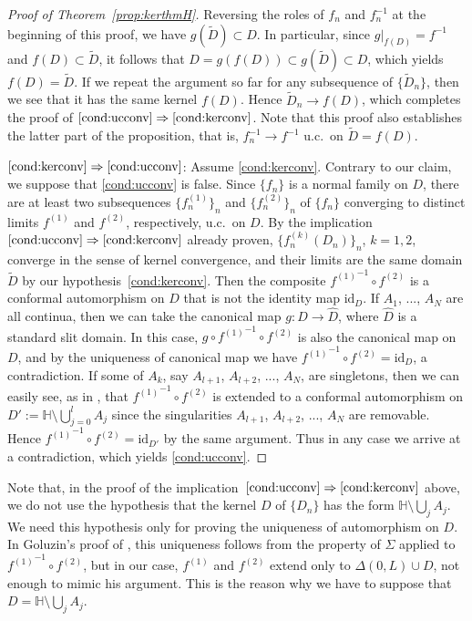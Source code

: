 \documentclass[preprint,12pt]{elsarticle}
\theoremstyle{definition}
\newcommand{\uhp}{\mathbb{H}}
\begin{document}
\begin{proof}[Proof of Theorem~\ref{prop:kerthmH}]
Reversing the roles of $f_n$ and $f_n^{-1}$ at the beginning of this proof,
we have $g(\tilde{D}) \subset D$.
In particular, since $g|_{f(D)}=f^{-1}$ and $f(D) \subset \tilde{D}$, it follows that
$D=g(f(D)) \subset g(\tilde{D}) \subset D$, which yields $f(D)=\tilde{D}$.
If we repeat the argument so far for any subsequence of $\{\tilde{D}_n\}$,
then we see that it has the same kernel $f(D)$.
Hence $\tilde{D}_n \to f(D)$, which completes the proof of
$\eqref{cond:ucconv} \Rightarrow \eqref{cond:kerconv}$.
Note that this proof also establishes the latter part of the proposition,
that is, $f_n^{-1} \to f^{-1}$ u.c.\ on $\tilde{D}=f(D)$.

\noindent
$\eqref{cond:kerconv} \Rightarrow \eqref{cond:ucconv}$:
Assume \eqref{cond:kerconv}.
Contrary to our claim, we suppose that \eqref{cond:ucconv} is false.
Since $\{f_n\}$ is a normal family on $D$,
there are at least two subsequences $\{f^{(1)}_n\}_n$ and $\{f^{(2)}_n\}_n$
of $\{f_n\}$ converging to distinct limits $f^{(1)}$ and $f^{(2)}$, respectively,
u.c.\ on $D$.
By the implication~$\eqref{cond:ucconv} \Rightarrow \eqref{cond:kerconv}$
already proven, $\{f^{(k)}_n(D_n)\}_n$, $k=1, 2$, converge in the sense of
kernel convergence, and their limits are the same domain $\tilde{D}$
by our hypothesis~\eqref{cond:kerconv}.
Then the composite ${f^{(1)}}^{-1} \circ f^{(2)}$ is a conformal automorphism on $D$
that is not the identity map $\mathrm{id}_D$.
If $A_1$, ..., $A_N$ are all continua, then we can take the canonical map
$g \colon D \to \hat{D}$, where $\hat{D}$ is a standard slit domain.
In this case, $g \circ {f^{(1)}}^{-1} \circ f^{(2)}$ is also the canonical map on $D$,
and by the uniqueness of canonical map we have
${f^{(1)}}^{-1} \circ f^{(2)}=\mathrm{id}_D$, a contradiction.
If some of $A_k$, say $A_{l+1}$, $A_{l+2}$, ..., $A_N$, are singletons,
then we can easily see, as in \cite[Exercise~15.2.1]{Co95},
that ${f^{(1)}}^{-1} \circ f^{(2)}$ is extended to a conformal automorphism
on $D':=\uhp \setminus \bigcup_{j=0}^{l} A_j$ since the singularities
$A_{l+1}$, $A_{l+2}$, ..., $A_N$ are removable.
Hence ${f^{(1)}}^{-1} \circ f^{(2)}=\mathrm{id}_{D'}$ by the same argument.
Thus in any case we arrive at a contradiction, which yields \eqref{cond:ucconv}.
\end{proof}

Note that, in the proof
of the implication~$\eqref{cond:ucconv} \Rightarrow \eqref{cond:kerconv}$ above,
we do not use the hypothesis that the kernel $D$ of $\{D_n\}$ has the form
$\uhp \setminus \bigcup_{j} A_j$.
We need this hypothesis only for proving the uniqueness of automorphism on $D$.
In Goluzin's proof of \cite[Theorem~V.5.1]{Go69}, this uniqueness follows
from the property of $\Sigma$ applied to ${f^{(1)}}^{-1} \circ f^{(2)}$,
but in our case, $f^{(1)}$ and $f^{(2)}$ extend only to $\Delta(0, L) \cup D$,
not enough to mimic his argument.
This is the reason why we have to suppose that $D=\uhp \setminus \bigcup_{j} A_j$.
\end{document}
